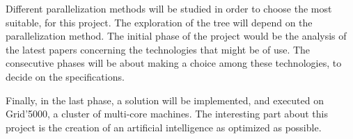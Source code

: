 Different parallelization methods will be studied in order to choose the most suitable, for this project.
The exploration of the tree will depend on the parallelization method.
The initial phase of the project would be the analysis of the latest papers concerning the technologies that might be of use.
The consecutive phases will be about making a choice among these technologies, to decide on the specifications.
\newline

Finally, in the last phase, a solution will be implemented, and executed on Grid'5000, a cluster of multi-core machines.
The interesting part about this project is the creation of an artificial intelligence as optimized as possible.


